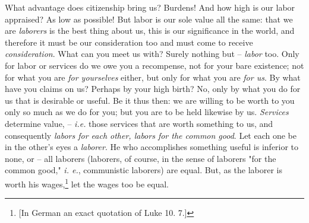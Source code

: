 \documentclass[a4paper]{book}
\begin{document}
What advantage does citizenship bring us? Burdens! And how high is our labor 
appraised? As low as possible! But labor is our sole value all the same: that 
we are \textit{laborers} is the best thing about us, this is our significance 
in the world, and therefore it must be our consideration too and must come to 
receive \textit{consideration}. What can you meet us with? Surely nothing but 
-- \textit{labor} too. Only for labor or services do we owe you a recompense, 
not for your bare existence; not for what you are \textit{for yourselves} 
either, but only for what you are \textit{for us}. By what have you claims on 
us? Perhaps by your high birth? No, only by what you do for us that is 
desirable or useful. Be it thus then: we are willing to be worth to you only 
so much as we do for you; but you are to be held likewise by us. 
\textit{Services} determine value, -- \textit{i.e.} those services that are 
worth something to us, and consequently \textit{labors for each other, labors 
for the common good}. Let each one be in the other's eyes a \textit{laborer}. 
He who accomplishes something useful is inferior to none, or -- all laborers 
(laborers, of course, in the sense of laborers "{}for the common good,"{} 
\textit{i. e.}, communistic laborers) are equal. But, as the laborer is worth 
his wages,\footnote{[In German an exact quotation of Luke 10. 7.]} let the 
wages too be equal.
\end{document}
